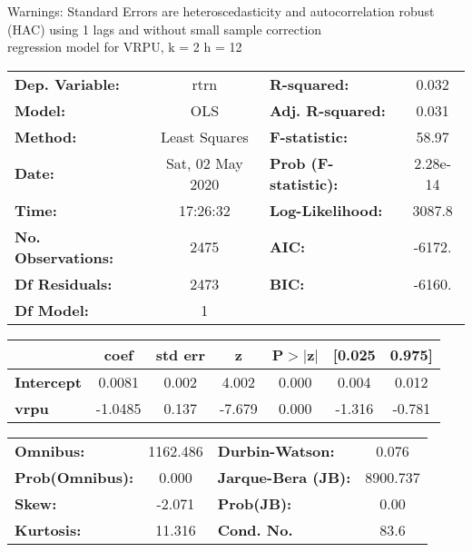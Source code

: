 Warnings: \newline
 [1] Standard Errors are heteroscedasticity and autocorrelation robust (HAC) using 1 lags and without small sample correction\\ 

regression model for VRPU, k = 2 h = 12\begin{center}
\begin{tabular}{lclc}
\toprule
\textbf{Dep. Variable:}    &       rtrn       & \textbf{  R-squared:         } &     0.032   \\
\textbf{Model:}            &       OLS        & \textbf{  Adj. R-squared:    } &     0.031   \\
\textbf{Method:}           &  Least Squares   & \textbf{  F-statistic:       } &     58.97   \\
\textbf{Date:}             & Sat, 02 May 2020 & \textbf{  Prob (F-statistic):} &  2.28e-14   \\
\textbf{Time:}             &     17:26:32     & \textbf{  Log-Likelihood:    } &    3087.8   \\
\textbf{No. Observations:} &        2475      & \textbf{  AIC:               } &    -6172.   \\
\textbf{Df Residuals:}     &        2473      & \textbf{  BIC:               } &    -6160.   \\
\textbf{Df Model:}         &           1      & \textbf{                     } &             \\
\bottomrule
\end{tabular}
\begin{tabular}{lcccccc}
                   & \textbf{coef} & \textbf{std err} & \textbf{z} & \textbf{P$> |$z$|$} & \textbf{[0.025} & \textbf{0.975]}  \\
\midrule
\textbf{Intercept} &       0.0081  &        0.002     &     4.002  &         0.000        &        0.004    &        0.012     \\
\textbf{vrpu}      &      -1.0485  &        0.137     &    -7.679  &         0.000        &       -1.316    &       -0.781     \\
\bottomrule
\end{tabular}
\begin{tabular}{lclc}
\textbf{Omnibus:}       & 1162.486 & \textbf{  Durbin-Watson:     } &    0.076  \\
\textbf{Prob(Omnibus):} &   0.000  & \textbf{  Jarque-Bera (JB):  } & 8900.737  \\
\textbf{Skew:}          &  -2.071  & \textbf{  Prob(JB):          } &     0.00  \\
\textbf{Kurtosis:}      &  11.316  & \textbf{  Cond. No.          } &     83.6  \\
\bottomrule
\end{tabular}
\end{center}


